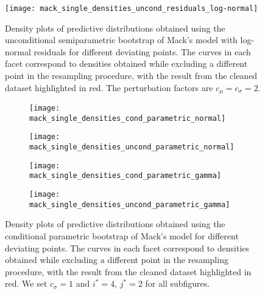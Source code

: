 \documentclass[a4paper]{book}
\begin{document}
\begin{landscape}
  \begin{figure}
    \centering
    \texttt{[image: mack\_single\_densities\_uncond\_residuals\_log-normal]}
    \caption{Density plots of predictive distributions obtained using the unconditional semiparametric bootstrap of Mack's model with log-normal residuals for different deviating points. The curves in each facet correspond to densities obtained while excluding a different point in the resampling procedure, with the result from the cleaned dataset highlighted in red. The perturbation factors are $c_\mu = c_\sigma = 2$.}
    \label{fig:mack-single-uncond-semiparam-log-normal}
  \end{figure}
\end{landscape}

\begin{landscape}
  \begin{figure}
    \begin{subfigure}{0.5\linewidth}
      \centering
      \texttt{[image: mack\_single\_densities\_cond\_parametric\_normal]}
    \end{subfigure}
    \begin{subfigure}{0.5\linewidth}
      \centering
      \texttt{[image: mack\_single\_densities\_uncond\_parametric\_normal]}
    \end{subfigure}
    \begin{subfigure}{0.5\linewidth}
      \centering
      \texttt{[image: mack\_single\_densities\_cond\_parametric\_gamma]}
    \end{subfigure}
    \begin{subfigure}{0.5\linewidth}
      \centering
      \texttt{[image: mack\_single\_densities\_uncond\_parametric\_gamma]}
    \end{subfigure}
    \caption{Density plots of predictive distributions obtained using the conditional parametric bootstrap of Mack's model for different deviating points. The curves in each facet correspond to densities obtained while excluding a different point in the resampling procedure, with the result from the cleaned dataset highlighted in red. We set $c_\sigma = 1$ and $i^* = 4$, $j^* = 2$ for all subfigures.}
    \label{fig:mack-single-param}
  \end{figure}
\end{landscape}
\end{document}
